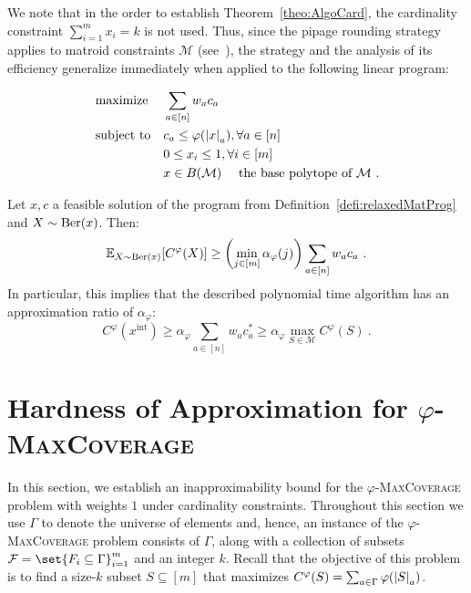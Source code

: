 We note that in the order to establish Theorem~\ref{theo:AlgoCard}, the cardinality constraint $\sum_{i=1}^m x_i = k$ is not used. Thus, since the pipage rounding strategy applies to matroid constraints $\mathcal{M}$ (see~\cite[Lemma 3.4]{Vondrak07}), the strategy and the analysis of its efficiency generalize immediately when applied to the following linear program:

\begin{definition}
  \begin{equation}
    \begin{aligned}
      &\operatorname{\text{maximize}}&& \sum_{a \in [n]} w_ac_a \\
      &\operatorname{\text{subject to}}&& c_a \leq \varphi(\abs{x}_a), \forall a \in [n]\\
      &&& 0 \leq x_i \leq 1, \forall i \in [m]\\
      &&& x \in B(\mathcal{M}) \quad \text{ the base polytope of } \mathcal{M} \ .
    \end{aligned}
  \end{equation}
  \label{defi:relaxedMatProg}
\end{definition}

\begin{theorem}
  Let $x,c$ a feasible solution of the program from Definition~\ref{defi:relaxedMatProg} and $X \sim \operatorname{\text{Ber}}(x)$. Then:
  \[\mathbb{E}_{X \sim \operatorname{\text{Ber}}(x)}[C^{\varphi}(X)] \geq \left(\min_{j \in [m]} \alpha_{\varphi}(j)\right) \sum_{a \in [n]} w_ac_a \ .\]
  In particular, this implies that the described polynomial time algorithm has an approximation ratio of $\alpha_{\varphi}$:
  \[C^{\varphi}(x^{\text{int}}) \geq \alpha_{\varphi} \sum_{a \in [n]} w_ac^*_a \geq \alpha_{\varphi} \max_{S \in \mathcal{M}} C^{\varphi}(S)\ .\]
  \label{theo:AlgoMat}
\end{theorem}

    
\section{Hardness of Approximation for $\varphi$-\textsc{MaxCoverage}}
\label{section:Hardness}
In this section, we establish an inapproximability bound for the $\varphi$-\textsc{MaxCoverage} problem with weights $1$ under cardinality constraints. Throughout this section we use $\Gamma$ to denote the universe of elements and, hence, an instance of the $\varphi$-\textsc{MaxCoverage} problem consists of $\Gamma$, along with a collection of subsets $\mathcal{F} = \set{F_i \subseteq \Gamma}_{i=1}^m$  and an integer $k$. Recall that the objective of this problem is to find a size-$k$ subset $S \subseteq [m]$ that maximizes $C^{\varphi}(S) = \sum_{a \in \Gamma}\varphi(\abs{S}_a)$.

